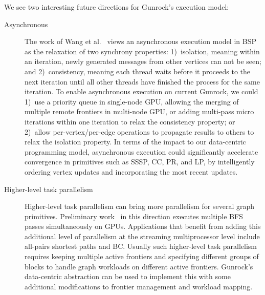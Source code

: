 \documentclass[format=acmsmall,review=false,screen=true]{acmart}
\begin{document}
We see two interesting future directions for Gunrock's execution
model:

\begin{description}
\item[Asynchronous] The work of Wang et al.~
  views an asynchronous execution model in BSP as the relaxation of
  two synchrony properties: 1)~isolation, meaning within an iteration,
  newly generated messages from other vertices can not be seen; and
  2)~consistency, meaning each thread waits before it proceeds to the
  next iteration until all other threads have finished the process for
  the same iteration. To enable asynchronous execution on current
  Gunrock, we could 1)~use a priority queue in single-node GPU,
  allowing the merging of multiple remote frontiers in multi-node GPU,
  or adding multi-pass micro iterations within one iteration to relax
  the consistency property; or 2)~allow per-vertex/per-edge operations
  to propagate results to others to relax the isolation property. In
  terms of the impact to our data-centric programming model,
  asynchronous execution could significantly accelerate convergence in
  primitives such as SSSP, CC, PR, and LP, by intelligently ordering
  vertex updates and incorporating the most recent updates.
\item[Higher-level task parallelism] Higher-level task parallelism can
  bring more parallelism for several graph primitives. Preliminary
  work~\cite{McLaughlin:2015:FES,Liu:2016:ICB} in this direction
  executes multiple BFS passes simultaneously on GPUs. Applications
  that benefit from adding this additional level of parallelism at the
  streaming multiprocessor level include all-pairs shortest paths and
  BC\@. Usually such higher-level task parallelism requires keeping
  multiple active frontiers and specifying different groups of blocks
  to handle graph workloads on different active frontiers. Gunrock's
  data-centric abstraction can be used to implement this with some
  additional modifications to frontier management and workload
  mapping.
\end{description}
\end{document}
